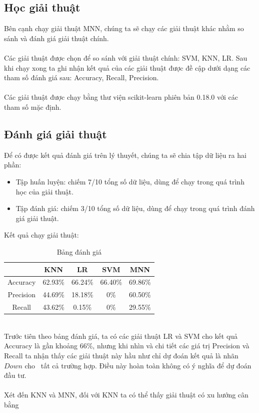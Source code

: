 \subsection{Học giải thuật}
Bên cạnh chạy giải thuật MNN, chúng ta sẽ chạy các giải thuật khác nhằm so sánh 
và đánh giá giải thuật chính.\\\\
Các giải thuật được chọn để so sánh với giải thuật chính: SVM, KNN, LR. Sau khi 
chạy xong ta ghi nhận kết quả của các giải thuật được đề cập dưới dạng các tham 
số đánh giá sau: Accuracy, Recall, Precision.\\\\
Các giải thuật được chạy bằng thư viện scikit-learn phiên bản 0.18.0 với các 
tham số mặc định.
\subsection{Đánh giá giải thuật}
Để có được kết quả đánh giá trên lý thuyết, chúng ta sẽ chia tập dữ liệu ra hai 
phần:
\begin{itemize}
\item Tập huấn luyện: chiếm 7/10 tổng số dữ liệu, dùng để chạy trong quá trình 
học của giải thuật.
\item Tập đánh giá: chiếm 3/10 tổng số dữ liệu, dùng để chạy trong quá trình 
đánh giá giải thuật.
\end{itemize}
Kết quả chạy giải thuật:
\begin{table}[h]
\centering
\begin{tabular}{ |c|c|c|c|c| }
\hline
 & KNN & LR & SVM & MNN \\
\hline
Accuracy & 62.93\% & 66.24\% & 66.40\% & 69.86\% \\
\hline
Precision & 44.69\% & 18.18\% & 0\% & 60.50\% \\
\hline
Recall & 43.62\% & 0.15\% & 0\% & 29.55\% \\
\hline
\end{tabular}
\caption{Bảng đánh giá}
\end{table}\\
Trước tiên theo bảng đánh giá, ta có các giải thuật LR và SVM cho kết quả Accuracy
là gần khoảng 66\%, nhưng khi nhìn và chi tiết các giá trị Precision và Recall 
ta nhận thấy các giải thuật này hầu như chỉ dự đoán kết quả là nhãn $Down$ cho \
tất cả trường hợp. Điều này hoàn toàn không có ý nghĩa để dự đoán đầu tư.\\\\
Xét đến KNN và MNN, đối với KNN ta có thể thấy giải thuật có xu hướng cân bằng 
